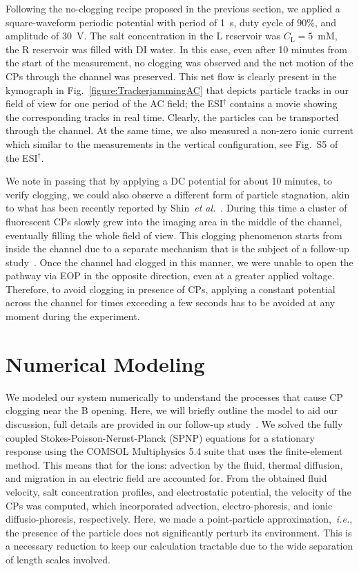 \documentclass[twoside,twocolumn,9pt]{article}
\begin{document}
Following the no-clogging recipe proposed in the previous section, we applied a square-waveform periodic potential with period of 1~s, duty cycle of $90\%$, and amplitude of $30$~V. The salt concentration in the L reservoir was $C_{\mathrm{L}} = 5$~mM, the R reservoir was filled with DI water. In this case, even after 10 minutes from the start of the measurement, no clogging was observed and the net motion of the CPs through the channel was preserved. 
This net flow is clearly present in the kymograph in Fig.~\ref{figure:TrackerjammingAC} that depicts particle tracks in our field of view for one period of the AC field; the ESI$^{\dag}$ contains a movie showing the corresponding tracks in real time.
Clearly, the particles can be transported through the channel. 
At the same time, we also measured a non-zero ionic current which similar to the measurements in the vertical configuration, see Fig.~S5 of the ESI$^{\dag}$.

We note in passing that by applying a DC potential for about 10 minutes, to verify clogging, we could also observe a different form of particle stagnation, akin to what has been recently reported by Shin~\textit{et al.}~\cite{PhysRevX.7.041038}. 
During this time a cluster of fluorescent CPs slowly grew into the imaging area in the middle of the channel, eventually filling the whole field of view. 
This clogging phenomenon starts from inside the channel due to a separate mechanism that is the subject of a follow-up study~\cite{zhu_under_prep}.
Once the channel had clogged in this manner, we were unable to open the pathway via EOP in the opposite direction, even at a greater applied voltage.
Therefore, to avoid clogging in presence of CPs, applying a constant potential across the channel for times exceeding a few seconds has to be avoided at any moment during the experiment.

\section*{Numerical Modeling}

We modeled our system numerically to understand the processes that cause CP clogging near the B opening.
Here, we will briefly outline the model to aid our discussion, full details are provided in our follow-up study~\cite{zhu_under_prep}. We solved the fully coupled Stokes-Poisson-Nernst-Planck (SPNP) equations for a stationary response using the COMSOL Multiphysics 5.4 suite that uses the finite-element method.
This means that for the ions: advection by the fluid, thermal diffusion, and migration in an electric field are accounted for.
From the obtained fluid velocity, salt concentration profiles, and electrostatic potential, the velocity of the CPs was computed, which incorporated advection, electro-phoresis, and ionic diffusio-phoresis, respectively.
Here, we made a point-particle approximation,~\textit{i.e.}, the presence of the particle does not significantly perturb its environment. This is a necessary reduction to keep our calculation tractable due to the wide separation of length scales involved.
\end{document}
